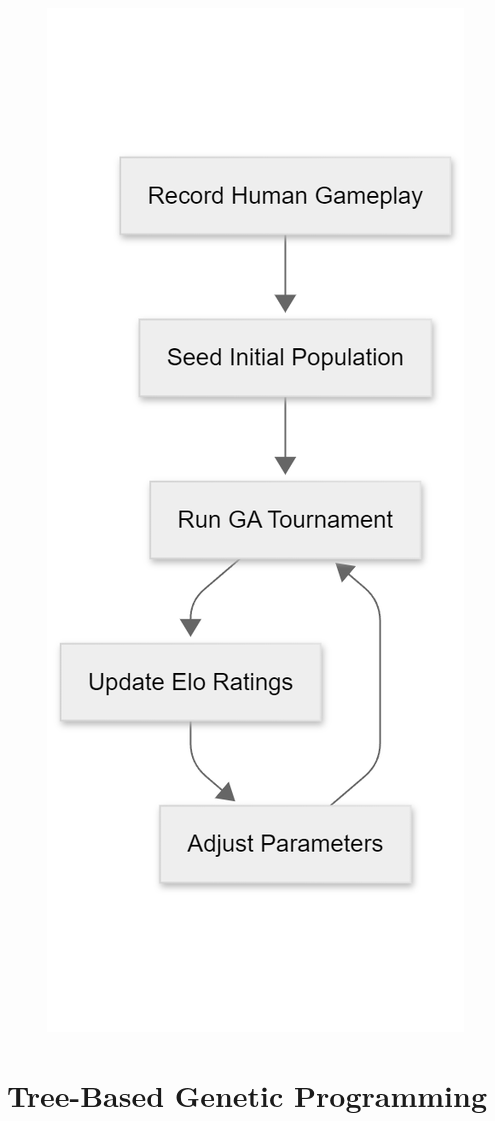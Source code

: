 \documentclass[sigconf]{acmart} %
\begin{document}
\begin{figure}
	\centering
	\includegraphics[width=0.7\linewidth]{pictures/workflow}
	\caption[Critical path for future work]{}
	\label{fig:workflow}
\end{figure}

\section{Tree-Based Genetic Programming}
\label{sec:tree_train}  %
\end{document}
